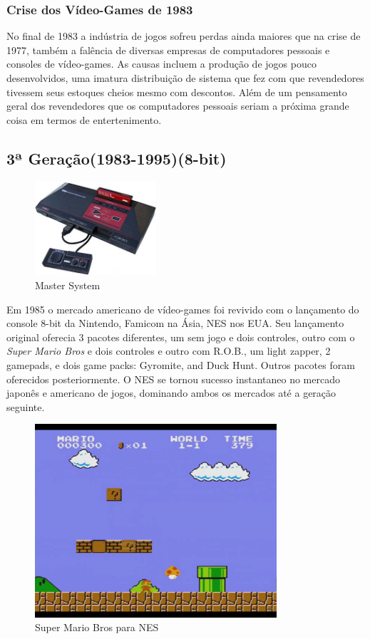 \documentclass[paper=a4, fontsize=11pt]{scrartcl}	%
\numberwithin{equation}{section}															%
\numberwithin{figure}{section}																%
\numberwithin{table}{section}																%
\begin{document}
\subsubsection*{Crise dos Vídeo-Games de 1983}
No final de 1983 a indústria de jogos sofreu perdas ainda maiores que na crise de 1977, também a falência de diversas empresas de computadores pessoais e consoles de vídeo-games. As causas incluem a produção de jogos pouco desenvolvidos, uma imatura distribuição de sistema que fez com que revendedores tivessem seus estoques cheios mesmo com descontos. Além de um pensamento geral dos revendedores que os computadores pessoais seriam a próxima grande coisa em termos de entertenimento.

\subsection{3ª Geração(1983-1995)(8-bit)}
\begin{figure}[h!]
	\centering
    \includegraphics[width=0.4\textwidth]{img/mastersystem}
    \caption{Master System}
\end{figure}
Em 1985 o mercado americano de vídeo-games foi revivido com o lançamento do console 8-bit da Nintendo, Famicom na Ásia, NES nos EUA. Seu lançamento original oferecia 3 pacotes diferentes, um sem jogo e dois controles, outro com o \textit{Super Mario Bros} e dois controles e outro com R.O.B., um light zapper, 2 gamepads, e dois game packs: Gyromite, and Duck Hunt. Outros pacotes foram oferecidos posteriormente. O NES se tornou sucesso instantaneo no mercado japonês e americano de jogos, dominando ambos os mercados até a geração seguinte.\\
\begin{figure}[h!]
	\centering
    \includegraphics[width=0.8\textwidth]{img/mario}
    \caption{Super Mario Bros para NES}
\end{figure}
\end{document}
